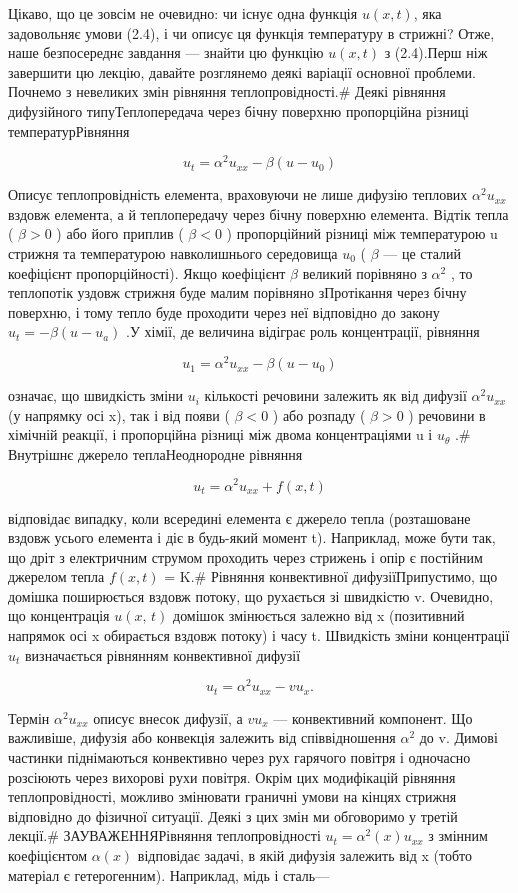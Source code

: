 \documentclass[
  ukrainian,
]{article}
\begin{document}
Цікаво, що це зовсім не очевидно: чи існує одна функція \(u(x, t)\), яка
задовольняє умови (2.4), і чи описує ця функція температуру в стрижні?
Отже, наше безпосереднє завдання --- знайти цю функцію \(u(x, t)\) з
(2.4).Перш ніж завершити цю лекцію, давайте розглянемо деякі варіації
основної проблеми. Почнемо з невеликих змін рівняння теплопровідності.\#
Деякі рівняння дифузійного типуТеплопередача через бічну поверхню
пропорційна різниці температурРівняння

\[
u_t = \alpha^2 u_{xx} - \beta (u - u_0)
\]

Описує теплопровідність елемента, враховуючи не лише дифузію теплових
\(\alpha^2 u_{xx}\) вздовж елемента, а й теплопередачу через бічну
поверхню елемента. Відтік тепла ( \(\beta > 0\) ) або його приплив (
\(\beta < 0\) ) пропорційний різниці між температурою u стрижня та
температурою навколишнього середовища \(u_0\) ( \(\beta\) --- це сталий
коефіцієнт пропорційності). Якщо коефіцієнт \(\beta\) великий порівняно
з \(\alpha^2\) , то теплопотік уздовж стрижня буде малим порівняно
зПротікання через бічну поверхню, і тому тепло буде проходити через неї
відповідно до закону \(u_t = -\beta (u - u_a)\) .У хімії, де величина
відіграє роль концентрації, рівняння

\[
u_1 = \alpha^2 u_{xx} - \beta (u - u_0)
\]

означає, що швидкість зміни \(u_i\) кількості речовини залежить як від
дифузії \(\alpha^2 u_{xx}\) (у напрямку осі x), так і від появи (
\(\beta < 0\) ) або розпаду ( \(\beta > 0\) ) речовини в хімічній
реакції, і пропорційна різниці між двома концентраціями u і
\(u_{\theta}\) .\# Внутрішнє джерело теплаНеоднородне рівняння

\[
u_t = \alpha^2 u_{xx} + f(x, t)
\]

відповідає випадку, коли всередині елемента є джерело тепла (розташоване
вздовж усього елемента і діє в будь-який момент t). Наприклад, може бути
так, що дріт з електричним струмом проходить через стрижень і опір є
постійним джерелом тепла \(f(x,t)\) = K.\# Рівняння конвективної
дифузіїПрипустимо, що домішка поширюється вздовж потоку, що рухається зі
швидкістю v. Очевидно, що концентрація \(u\left(x,\,t\right)\) домішок
змінюється залежно від x (позитивний напрямок осі x обирається вздовж
потоку) і часу t. Швидкість зміни концентрації \(u_t\) визначається
рівнянням конвективної дифузії

\[
u_t = \alpha^2 u_{xx} - v u_x.
\]

Термін \(\alpha^2 u_{xx}\) описує внесок дифузії, а \(vu_x\) ---
конвективний компонент. Що важливіше, дифузія або конвекція залежить від
співвідношення \(\alpha^2\) до v. Димові частинки піднімаються
конвективно через рух гарячого повітря і одночасно розсіюють через
вихорові рухи повітря. Окрім цих модифікацій рівняння теплопровідності,
можливо змінювати граничні умови на кінцях стрижня відповідно до
фізичної ситуації. Деякі з цих змін ми обговоримо у третій лекції.\#
ЗАУВАЖЕННЯРівняння теплопровідності \(u_t = \alpha^2(x) u_{xx}\) з
змінним коефіцієнтом \(\alpha(x)\) відповідає задачі, в якій дифузія
залежить від x (тобто матеріал є гетерогенним). Наприклад, мідь і
сталь---
\end{document}
